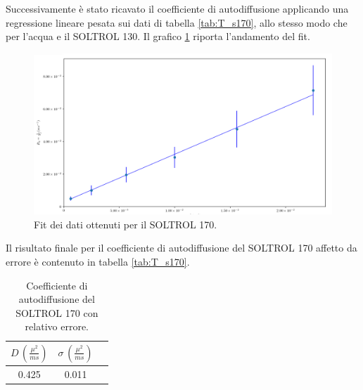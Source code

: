 Successivamente è stato ricavato il coefficiente di autodiffusione applicando una regressione lineare pesata sui dati di tabella \ref{tab:T_s170}, allo stesso modo che per l'acqua e il SOLTROL 130.
Il grafico \ref{fig:Df_s170} riporta l'andamento del fit.

\begin{figure}[h!]
\centering
\includegraphics[scale=0.3]{Figure/SOLTROL170_calc.png}
\caption{Fit dei dati ottenuti per il SOLTROL 170.}
\label{fig:Df_s170}
\end{figure}

Il risultato finale per il coefficiente di autodiffusione del SOLTROL 170 affetto da errore è contenuto in tabella \ref{tab:T_s170}. 


\begin{table}[h!]
    \begin{center}
    \begin{tabular}{c c c}
    \toprule
    	$D\,(\frac{{\mu}^2}{ms})$ & $\sigma\,(\frac{{\mu}^2}{ms})$ \\
    \midrule
    	0.425	&	0.011	\\
    \bottomrule
    \end{tabular}
    \caption{Coefficiente di autodiffusione del SOLTROL 170 con relativo errore.}
    \label{tab:Df_s170}
    \end{center}
\end{table}




